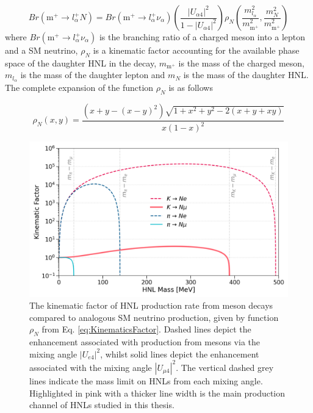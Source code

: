 \begin{equation}
	\label{eq:kaon_decay_hnl}
	Br(\text{m}^{+}\rightarrow l^{+}_{\alpha}N) = Br(\text{m}^{+}\rightarrow l^{+}_{\alpha}\nu_{\alpha})\left(\frac{|U_{\alpha 4}|^{2}}{1 - |U_{\alpha 4}|^{2}}\right)\rho_{N}\left(\frac{m^{2}_{l_{\alpha}}}{m^{2}_{\text{m}^{+}}}, \frac{m^{2}_{N}}{m^{2}_{\text{m}^{+}}} \right) 
\end{equation}
where $Br(\text{m}^{+}\rightarrow l^{+}_{\alpha}\nu_{\alpha})$ is the branching ratio of a charged meson into a lepton and a SM neutrino, $\rho_{N}$ is a kinematic factor accounting for the available phase space of the daughter HNL in the decay, $m_{\text{m}^{+}}$ is the mass of the charged meson, $m_{l_{\alpha}}$ is the mass of the daughter lepton and $m_{N}$ is the mass of the daughter HNL.
The complete expansion of the function $\rho_{N}$ is as follows \cite{HNLKelly}

\begin{equation}
	\rho_{N}(x,y) = \frac{(x+y-(x-y)^{2})\sqrt{1+x^{2}+y^{2}-2(x+y+xy)}}{x(1-x)^{2}}
\label{eq:KinematicsFactor}
\end{equation}

\begin{figure}[t] 
\centering    
\includegraphics[width=1.0\textwidth]{kinematics_factor}
\caption[KinematicsFactor]{
The kinematic factor of HNL production rate from meson decays compared to analogous SM neutrino production, given by function $\rho_{N}$ from Eq. \ref{eq:KinematicsFactor}.
Dashed lines depict the enhancement associated with production from mesons via the mixing angle $|U_{e4}|^{2}$, whilst solid lines depict the enhancement associated with the mixing angle $|U_{\mu4}|^{2}$.
The vertical dashed grey lines indicate the mass limit on HNLs from each mixing angle.
Highlighted in pink with a thicker line width is the main production channel of HNLs studied in this thesis.
}
\label{fig:KinematicsFactor}
\end{figure}

